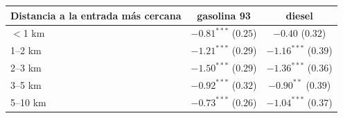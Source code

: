 \begin{tabular}{lcc}
\toprule
Distancia a la entrada más cercana & gasolina 93 & diesel \\
\midrule
$<$1 km & $-0.81^{***}$ ($0.25$) & $-0.40$ ($0.32$) \\
1--2 km & $-1.21^{***}$ ($0.29$) & $-1.16^{***}$ ($0.39$) \\
2--3 km & $-1.50^{***}$ ($0.29$) & $-1.36^{***}$ ($0.36$) \\
3--5 km & $-0.92^{***}$ ($0.32$) & $-0.90^{**}$ ($0.39$) \\
5--10 km & $-0.73^{***}$ ($0.26$) & $-1.04^{***}$ ($0.37$) \\
\bottomrule
\end{tabular}

